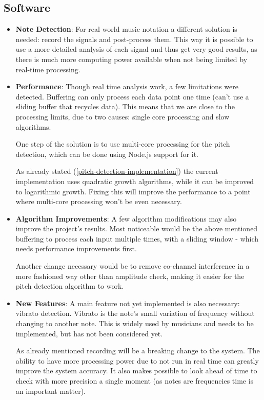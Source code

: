 \subsection{Software}
\begin{itemize}
  \item \textbf{Note Detection}: For real world music notation a different solution
  is needed: record the signals
  and post-process them. This way it is possible to use a more detailed analysis
  of each signal and thus get very good results, as there is much more computing
  power available when not being limited by real-time processing.  
  \item \textbf{Performance}: Though real time analysis work, a few limitations were detected. Buffering can only
  process each data point one time (can't use a sliding buffer that recycles data).
  This means that we are close to the processing limits, due to two causes: single
  core processing and slow algorithms. 
  
  One step of the solution is to use multi-core processing for the pitch detection,
  which can be done using Node.js support for it. 
  
  As already stated (\autoref{pitch-detection-implementation}) the current implementation
  uses quadratic growth algorithms, while it can be improved to logarithmic
  growth. Fixing this will improve the performance to a point where multi-core processing
  won't be even necessary.
  \item \textbf{Algorithm Improvements}: A few algorithm modifications may also improve the project's results. Most noticeable
  would be the above mentioned buffering to process each input multiple times, with a
  sliding window - which needs performance improvements first.
  
  Another change necessary would be to remove co-channel interference in a more fashioned
  way other than amplitude check, making it easier for the pitch detection algorithm to work.
  
  \item \textbf{New Features}: A main feature not yet implemented is also necessary: vibrato detection. Vibrato is the
  note's small variation of frequency without changing to another note. This is widely used
  by musicians and needs to be implemented, but has not been considered yet.
  
  As already mentioned recording will be a breaking change to the system. The ability to have
  more processing power due to not run in real time can greatly improve the system accuracy.
  It also makes possible to look ahead of time to check with more precision a single moment
  (as notes are frequencies time is an important matter).  
\end{itemize}
